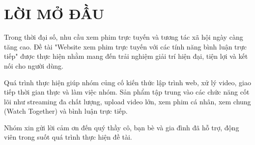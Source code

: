 
\newpage



\section{LỜI MỞ ĐẦU}

Trong thời đại số, nhu cầu xem phim trực tuyến và tương tác xã hội ngày càng tăng cao. Đề tài "Website xem phim trực tuyến với các tính năng bình luận trực tiếp" được thực hiện nhằm mang đến trải nghiệm giải trí hiện đại, tiện lợi và kết nối cho người dùng.

Quá trình thực hiện giúp nhóm củng cố kiến thức lập trình web, xử lý video, giao tiếp thời gian thực và làm việc nhóm. Sản phẩm tập trung vào các chức năng cốt lõi như streaming đa chất lượng, upload video lớn, xem phim cá nhân, xem chung (Watch Together) và bình luận trực tiếp.

Nhóm xin gửi lời cảm ơn đến quý thầy cô, bạn bè và gia đình đã hỗ trợ, động viên trong suốt quá trình thực hiện đề tài.